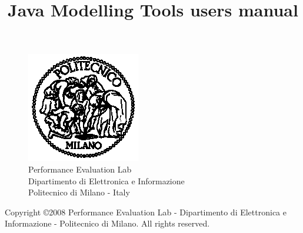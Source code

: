 \documentclass[10pt, twoside, a4paper]{book}
\title{Java Modelling Tools users manual}
\begin{document}
\pagestyle{headings}  \setcounter{page}{-1}

\begin{titlepage}
\begin{figure}[h]
\begin{center}
\includegraphics{img/poli.eps}\\
Performance Evaluation Lab\\
Dipartimento di Elettronica e Informazione\\
Politecnico di Milano - Italy
\end{center}
\end{figure}
\newlength{\centeroffset}
\setlength{\centeroffset}{-0.5\oddsidemargin}
\addtolength{\centeroffset}{0.5\evensidemargin}

\noindent\hspace*{\centeroffset}

\noindent\hspace*{\centeroffset}




\pagebreak
\begin{small}
  Copyright \copyright 2008 Performance Evaluation Lab - Dipartimento
  di Elettronica e Informazione - Politecnico di Milano.
  All rights reserved.


\end{small}
\end{titlepage}
\end{document}
